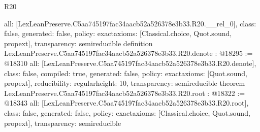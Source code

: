 \begin{lexlean}{R20}
\begin{coremodule}
{  all: [LexLeanPreserve.C5aa745197fac34aacb52a526378e3b33.R20.__rel_0],
  class: false,
  generated: false,
  policy: exact{axioms: [Classical.choice, Quot.sound, propext]},
  transparency: semireducible
}
definition LexLeanPreserve.C5aa745197fac34aacb52a526378e3b33.R20.denote : @18295 := @18310 {
  all: [LexLeanPreserve.C5aa745197fac34aacb52a526378e3b33.R20.denote],
  class: false,
  compiled: true,
  generated: false,
  policy: exact{axioms: [Quot.sound, propext]},
  reducibility: regular{height: 10},
  transparency: semireducible
}
theorem LexLeanPreserve.C5aa745197fac34aacb52a526378e3b33.R20.root : @18322 := @18343 {
  all: [LexLeanPreserve.C5aa745197fac34aacb52a526378e3b33.R20.root],
  class: false,
  generated: false,
  policy: exact{axioms: [Classical.choice, Quot.sound, propext]},
  transparency: semireducible
}


\end{coremodule}
\end{lexlean}
